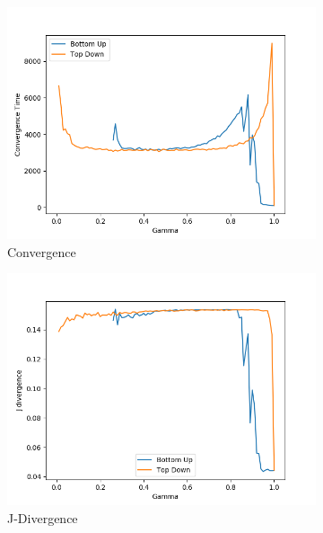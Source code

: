 \begin{figure}[H]
 \centering
  \begin{subfigure}[ht]{0.45\textwidth}
    \includegraphics[width=\textwidth]{Images/Figures/All/Convergence_Spite_ALL_n_3_p_100_gamma_100_runs_20.png}
    \caption{Convergence}
 \end{subfigure}
 \hfill
 \begin{subfigure}[ht]{0.45\textwidth}
    \includegraphics[width=\textwidth]{Images/Figures/All/J_Div_Spite_ALL_n_3_p_100_gamma_100_runs_20.png}
    \caption{J-Divergence}
 \end{subfigure}
 \hfill
 \begin{subfigure}[ht]{0.45\textwidth}

\end{subfigure}
\end{figure}
